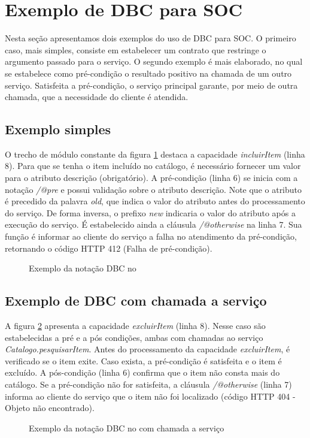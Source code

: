 \section{Exemplo de DBC para SOC}\label{sec:exemplobdc}

Nesta seção apresentamos dois exemplos do uso de DBC para SOC. O primeiro caso,
mais simples, consiste em estabelecer um contrato que restringe o argumento
passado para o serviço. O segundo exemplo é mais elaborado, no qual se
estabelece como pré-condição o resultado positivo na chamada de um outro
serviço. Satisfeita a pré-condição, o serviço principal garante, por meio de
outra chamada, que a necessidade do cliente é atendida.

\subsection{Exemplo simples}

O trecho de módulo \neoidl constante da figura \ref{lst:DBCSimple} destaca a
capacidade \emph{incluirItem} (linha 8). Para que se tenha o item incluído no
catálogo, é necessário fornecer um valor para o atributo descrição
(obrigatório). A pré-condição (linha 6) se inicia com a notação \emph{/@pre} e
possui validação sobre o atributo descrição. Note que o atributo é precedido
da palavra \emph{old}, que indica o valor do atributo antes do processamento do
serviço. De forma inversa, o prefixo \emph{new} indicaria o valor do atributo
após a execução do serviço. É estabelecido ainda a cláusula \emph{/@otherwise}
na linha 7. Sua função é informar ao cliente do serviço a falha no atendimento da pré-condição,
retornando o código HTTP 412 (Falha de pré-condição).
 
\begin{figure}[htb]
\begin{small}

\end{small}
\caption{Exemplo da notação DBC no \neoidl}
\label{lst:DBCSimple}
\end{figure}


\subsection{Exemplo de DBC com chamada a serviço}

A figura \ref{lst:DBCService} apresenta a capacidade \emph{excluirItem} (linha
8). Nesse caso são estabelecidas a pré e a pós condições, ambas com chamadas ao
serviço \emph{Catalogo.pesquisarItem}. Antes do processamento da capacidade
\emph{excluirItem}, é verificado se o item exite. Caso exista, a pré-condição é
satisfeita e o item é excluído. A pós-condição (linha 6) confirma que o item não
consta mais do catálogo. Se a pré-condição não for satisfeita, a cláusula
\emph{/@otherwise} (linha 7) informa ao cliente do serviço que o item não foi
localizado (código HTTP 404 - Objeto não encontrado).


\begin{figure}[htb]
\begin{small}

\end{small}
\caption{Exemplo da notação DBC no \neoidl com chamada a serviço}
\label{lst:DBCService}
\end{figure}